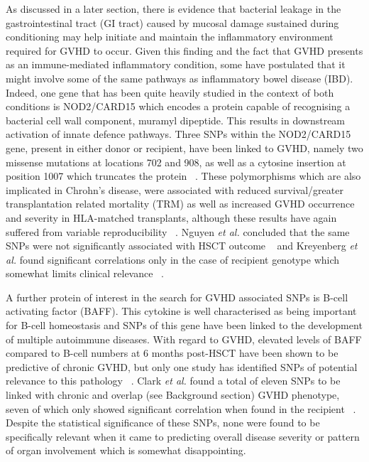 As discussed in a later section, there is evidence that bacterial leakage in the gastrointestinal tract (GI tract) caused by mucosal damage sustained during conditioning may help initiate and maintain the inflammatory environment required for GVHD to occur.  Given this finding and the fact that GVHD presents as an immune-mediated inflammatory condition, some have postulated that it might involve some of the same pathways as inflammatory bowel disease (IBD).  Indeed, one gene that has been quite heavily studied in the context of both conditions is NOD2/CARD15 which encodes a protein capable of recognising a bacterial cell wall component, muramyl dipeptide. This results in downstream activation of innate defence pathways. Three SNPs within the NOD2/CARD15 gene, present in either donor or recipient, have been linked to GVHD, namely two missense mutations at locations 702 and 908, as well as a cytosine insertion at position 1007 which truncates the protein ~\autocite{Hol2004}. These polymorphisms which are also implicated in Chrohn's disease, were associated with reduced survival/greater transplantation related mortality (TRM) as well as increased GVHD occurrence and severity in HLA-matched transplants, although these results have again suffered from variable reproducibility ~\autocite{Kre2011}. Nguyen \textit{et al.} concluded that the same SNPs were not significantly associated with HSCT outcome ~\autocite{Ngu2010} and Kreyenberg \textit{et al.} found significant correlations only in the case of recipient genotype which somewhat limits clinical relevance ~\autocite{Kre2011}. 

A further protein of interest in the search for GVHD associated SNPs is B-cell activating factor (BAFF). This cytokine is well characterised as being important for B-cell homeostasis and SNPs of this gene have been linked to the development of multiple autoimmune diseases. With regard to GVHD, elevated levels of BAFF compared to B-cell numbers at 6 months post-HSCT have been shown to be predictive of chronic GVHD, but only one study has identified SNPs of potential relevance to this pathology ~\autocite{Cla2011}. Clark \textit{et al.} found a total of eleven SNPs to be linked with chronic and overlap (see Background section) GVHD phenotype, seven of which only showed significant correlation when found in the recipient ~\autocite{Cla2011}. Despite the statistical significance of these SNPs, none were found to be specifically relevant when it came to predicting overall disease severity or pattern of organ involvement which is somewhat disappointing. 

